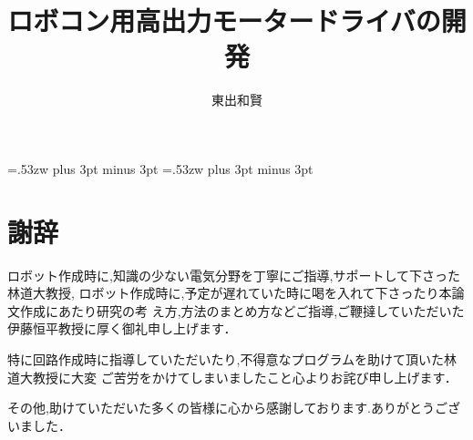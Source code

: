 \documentclass[12pt,oneside,dvipdfmx]{paper}
\title{ロボコン用高出力モータードライバの開発}
\author{東出和賢}
\begin{document}
\setlength{\baselineskip}{9truemm}

\kanjiskip=.53zw plus 3pt minus 3pt
\xkanjiskip=.53zw plus 3pt minus 3pt

\tableofcontents














\chapter*{謝辞}
ロボット作成時に,知識の少ない電気分野を丁寧にご指導,サポートして下さった林道大教授,
ロボット作成時に,予定が遅れていた時に喝を入れて下さったり本論文作成にあたり研究の考
え方,方法のまとめ方などご指導,ご鞭撻していただいた伊藤恒平教授に厚く御礼申し上げます．

特に回路作成時に指導していただいたり,不得意なプログラムを助けて頂いた林道大教授に大変
ご苦労をかけてしまいましたこと心よりお詫び申し上げます．

その他,助けていただいた多くの皆様に心から感謝しております.ありがとうございました．

\appendix



\end{document}
